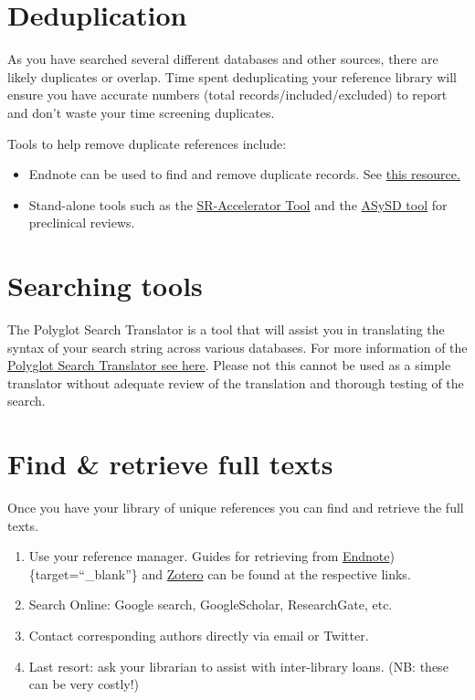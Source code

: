 \documentclass[
]{book}
\providecommand{\tightlist}{%
  \setlength{\itemsep}{0pt}\setlength{\parskip}{0pt}}
\begin{document}
\section{Deduplication}\label{deduplication}

As you have searched several different databases and other sources, there are likely duplicates or overlap. Time spent deduplicating your reference library will ensure you have accurate numbers (total records/included/excluded) to report and don't waste your time screening duplicates.

Tools to help remove duplicate references include:

\begin{itemize}
\tightlist
\item
  Endnote can be used to find and remove duplicate records. See \href{https://support.clarivate.com/Endnote/s/article/EndNote-20-Steps-to-remove-duplicates-from-your-EndNote-library?language=en_US}{this resource.}
\item
  Stand-alone tools such as the \href{https://doi.org/10.1186/2046-4053-4-6}{SR-Accelerator Tool} and the \href{https://camarades.shinyapps.io/ASySD/}{ASySD tool} for preclinical reviews.
\end{itemize}

\section{Searching tools}\label{searching-tools}

The Polyglot Search Translator is a tool that will assist you in translating the syntax of your search string across various databases. For more information of the \href{https://sr-accelerator.com/\#/polyglot}{Polyglot Search Translator see here}. Please not this cannot be used as a simple translator without adequate review of the translation and thorough testing of the search.

\section{Find \& retrieve full texts}\label{find-retrieve-full-texts}

Once you have your library of unique references you can find and retrieve the full texts.

\begin{enumerate}
\def\labelenumi{\arabic{enumi}.}
\tightlist
\item
  Use your reference manager. Guides for retrieving from \href{https://support.clarivate.com/Endnote/s/article/EndNote-Find-Full-Text-and-Ex-Libris-Alma-Primo-link-resolver?language=en_US}{Endnote})\{target=``\_blank''\} and \href{https://www.zotero.org/support/locate}{Zotero} can be found at the respective links.
\item
  Search Online: Google search, GoogleScholar, ResearchGate, etc.
\item
  Contact corresponding authors directly via email or Twitter.
\item
  Last resort: ask your librarian to assist with inter-library loans. (NB: these can be very costly!)
\end{enumerate}
\end{document}

